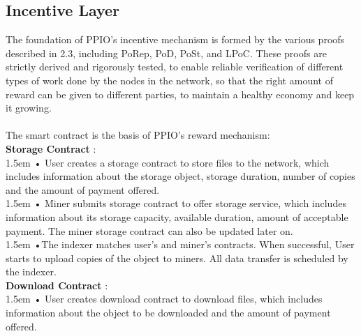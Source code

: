 \documentclass[10pt,a4paper]{article}
\begin{document}
        \subsection{Incentive Layer}  %
The foundation of PPIO’s incentive mechanism is formed by the various proofs described in 2.3, including PoRep, PoD, PoSt, and LPoC. These proofs are strictly derived and rigorously tested, to enable reliable verification of different types of work done by the nodes in the network, so that the right amount of reward can be given to different parties, to maintain a healthy economy and keep it growing.
\vspace{-0.5em}
\\ \\  The smart contract is the basis of PPIO’s reward mechanism:
\vspace{-0.5em}
\\

\noindent   
  {\bf Storage Contract }: 
  \vspace{-0.8em}
\\

\hangindent 1.5em
\noindent   
• User creates a storage contract to store files to the network, which includes information about the storage object, storage duration, number of copies and the amount of payment offered.
  \vspace{-0.8em}
\\

\hangindent 1.5em
\noindent   
• Miner submits storage contract to offer storage service, which includes information about its storage capacity, available duration, amount of acceptable payment. The miner storage contract can also be updated later on.
  \vspace{-0.8em}
\\

\hangindent 1.5em
\noindent   
•\quad The indexer matches user's and miner’s contracts. When successful, User starts to upload copies of the object to miners. All data transfer is scheduled by the indexer.
  \vspace{-0.5em}
\\

\noindent   
 {\bf Download Contract }: 
   \vspace{-0.8em}
\\

\hangindent 1.5em
\noindent   
• User creates download contract to download files, which includes information about the object to be downloaded and the amount of payment offered.
  \vspace{-0.8em}
\\
\end{document}
